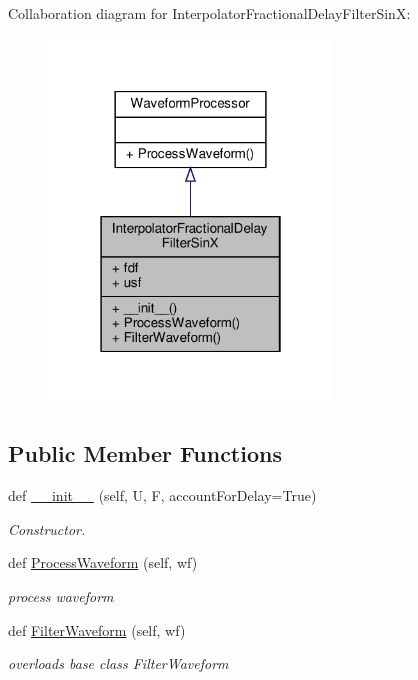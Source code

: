 Collaboration diagram for Interpolator\+Fractional\+Delay\+Filter\+SinX\+:
\nopagebreak
\begin{figure}[H]
\begin{center}
\leavevmode
\includegraphics[width=214pt]{classSignalIntegrity_1_1TimeDomain_1_1Filters_1_1InterpolatorSinX_1_1InterpolatorFractionalDelayFilterSinX__coll__graph}
\end{center}
\end{figure}
\subsection*{Public Member Functions}
\begin{DoxyCompactItemize}
\item 
def \hyperlink{classSignalIntegrity_1_1TimeDomain_1_1Filters_1_1InterpolatorSinX_1_1InterpolatorFractionalDelayFilterSinX_a81150f52975e0ef244e215c5faf0291e}{\+\_\+\+\_\+init\+\_\+\+\_\+} (self, U, F, account\+For\+Delay=True)
\begin{DoxyCompactList}\small\item\em Constructor. \end{DoxyCompactList}\item 
def \hyperlink{classSignalIntegrity_1_1TimeDomain_1_1Filters_1_1InterpolatorSinX_1_1InterpolatorFractionalDelayFilterSinX_ae09bec195c9cb1d5819e73b7be169b11}{Process\+Waveform} (self, wf)
\begin{DoxyCompactList}\small\item\em process waveform \end{DoxyCompactList}\item 
def \hyperlink{classSignalIntegrity_1_1TimeDomain_1_1Filters_1_1InterpolatorSinX_1_1InterpolatorFractionalDelayFilterSinX_a84e73c18250ca4a61482f94ad61e735b}{Filter\+Waveform} (self, wf)
\begin{DoxyCompactList}\small\item\em overloads base class Filter\+Waveform \end{DoxyCompactList}\end{DoxyCompactItemize}


